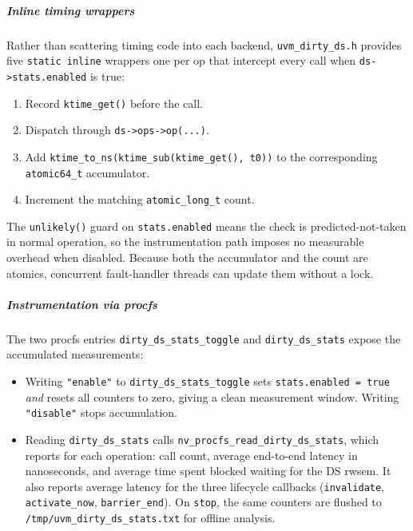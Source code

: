 \subparagraph{Inline timing wrappers}

Rather than scattering timing code into each backend,
\texttt{uvm\_dirty\_ds.h} provides five \texttt{static inline} wrappers
one per op that intercept every call when
\texttt{ds->stats.enabled} is true:

\begin{enumerate}
    \item Record \texttt{ktime\_get()} before the call.
    \item Dispatch through \texttt{ds->ops->op(...)}.
    \item Add \texttt{ktime\_to\_ns(ktime\_sub(ktime\_get(), t0))} to the
          corresponding \texttt{atomic64\_t} accumulator.
    \item Increment the matching \texttt{atomic\_long\_t} count.
\end{enumerate}

The \texttt{unlikely()} guard on \texttt{stats.enabled} means the check is
predicted-not-taken in normal operation, so the instrumentation path imposes
no measurable overhead when disabled.
Because both the accumulator and the count are atomics, concurrent fault-handler
threads can update them without a lock.

\subparagraph{Instrumentation via procfs}

The two procfs entries \texttt{dirty\_ds\_stats\_toggle} and
\texttt{dirty\_ds\_stats} expose the accumulated measurements:

\begin{itemize}
    \item Writing \texttt{"enable"} to \texttt{dirty\_ds\_stats\_toggle}
          sets \texttt{stats.enabled = true} \emph{and} resets all counters
          to zero, giving a clean measurement window.
          Writing \texttt{"disable"} stops accumulation.

    \item Reading \texttt{dirty\_ds\_stats} calls
          \texttt{nv\_procfs\_read\_dirty\_ds\_stats}, which reports for each
          operation: call count, average end-to-end latency in nanoseconds,
          and average time spent blocked waiting for the DS rwsem.
          It also reports average latency for the three lifecycle callbacks
          (\texttt{invalidate}, \texttt{activate\_now}, \texttt{barrier\_end}).
          On \texttt{stop}, the same counters are flushed to
          \texttt{/tmp/uvm\_dirty\_ds\_stats.txt} for offline analysis.
\end{itemize}

